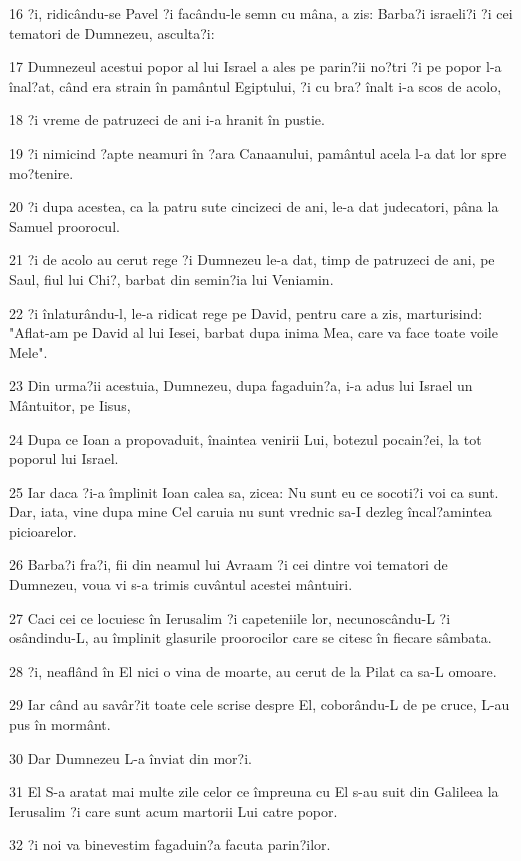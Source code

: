 \par 16 ?i, ridicându-se Pavel ?i facându-le semn cu mâna, a zis: Barba?i israeli?i ?i cei tematori de Dumnezeu, asculta?i:
\par 17 Dumnezeul acestui popor al lui Israel a ales pe parin?ii no?tri ?i pe popor l-a înal?at, când era strain în pamântul Egiptului, ?i cu bra? înalt i-a scos de acolo,
\par 18 ?i vreme de patruzeci de ani i-a hranit în pustie.
\par 19 ?i nimicind ?apte neamuri în ?ara Canaanului, pamântul acela l-a dat lor spre mo?tenire.
\par 20 ?i dupa acestea, ca la patru sute cincizeci de ani, le-a dat judecatori, pâna la Samuel proorocul.
\par 21 ?i de acolo au cerut rege ?i Dumnezeu le-a dat, timp de patruzeci de ani, pe Saul, fiul lui Chi?, barbat din semin?ia lui Veniamin.
\par 22 ?i înlaturându-l, le-a ridicat rege pe David, pentru care a zis, marturisind: "Aflat-am pe David al lui Iesei, barbat dupa inima Mea, care va face toate voile Mele".
\par 23 Din urma?ii acestuia, Dumnezeu, dupa fagaduin?a, i-a adus lui Israel un Mântuitor, pe Iisus,
\par 24 Dupa ce Ioan a propovaduit, înaintea venirii Lui, botezul pocain?ei, la tot poporul lui Israel.
\par 25 Iar daca ?i-a împlinit Ioan calea sa, zicea: Nu sunt eu ce socoti?i voi ca sunt. Dar, iata, vine dupa mine Cel caruia nu sunt vrednic sa-I dezleg încal?amintea picioarelor.
\par 26 Barba?i fra?i, fii din neamul lui Avraam ?i cei dintre voi tematori de Dumnezeu, voua vi s-a trimis cuvântul acestei mântuiri.
\par 27 Caci cei ce locuiesc în Ierusalim ?i capeteniile lor, necunoscându-L ?i osândindu-L, au împlinit glasurile proorocilor care se citesc în fiecare sâmbata.
\par 28 ?i, neaflând în El nici o vina de moarte, au cerut de la Pilat ca sa-L omoare.
\par 29 Iar când au savâr?it toate cele scrise despre El, coborându-L de pe cruce, L-au pus în mormânt.
\par 30 Dar Dumnezeu L-a înviat din mor?i.
\par 31 El S-a aratat mai multe zile celor ce împreuna cu El s-au suit din Galileea la Ierusalim ?i care sunt acum martorii Lui catre popor.
\par 32 ?i noi va binevestim fagaduin?a facuta parin?ilor.
